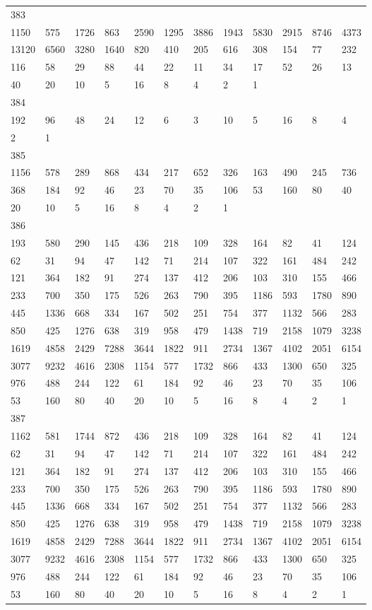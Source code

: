 \begin{longtable}{llllllllllll}
383&&&&&&&&&&&\\
1150& 575& 1726& 863& 2590& 1295& 3886& 1943& 5830& 2915& 8746& 4373\\
13120& 6560& 3280& 1640& 820& 410& 205& 616& 308& 154& 77& 232\\
116& 58& 29& 88& 44& 22& 11& 34& 17& 52& 26& 13\\
40& 20& 10& 5& 16& 8& 4& 2& 1& \\

384&&&&&&&&&&&\\
192& 96& 48& 24& 12& 6& 3& 10& 5& 16& 8& 4\\
2& 1& \\

385&&&&&&&&&&&\\
1156& 578& 289& 868& 434& 217& 652& 326& 163& 490& 245& 736\\
368& 184& 92& 46& 23& 70& 35& 106& 53& 160& 80& 40\\
20& 10& 5& 16& 8& 4& 2& 1& \\

386&&&&&&&&&&&\\
193& 580& 290& 145& 436& 218& 109& 328& 164& 82& 41& 124\\
62& 31& 94& 47& 142& 71& 214& 107& 322& 161& 484& 242\\
121& 364& 182& 91& 274& 137& 412& 206& 103& 310& 155& 466\\
233& 700& 350& 175& 526& 263& 790& 395& 1186& 593& 1780& 890\\
445& 1336& 668& 334& 167& 502& 251& 754& 377& 1132& 566& 283\\
850& 425& 1276& 638& 319& 958& 479& 1438& 719& 2158& 1079& 3238\\
1619& 4858& 2429& 7288& 3644& 1822& 911& 2734& 1367& 4102& 2051& 6154\\
3077& 9232& 4616& 2308& 1154& 577& 1732& 866& 433& 1300& 650& 325\\
976& 488& 244& 122& 61& 184& 92& 46& 23& 70& 35& 106\\
53& 160& 80& 40& 20& 10& 5& 16& 8& 4& 2& 1\\

387&&&&&&&&&&&\\
1162& 581& 1744& 872& 436& 218& 109& 328& 164& 82& 41& 124\\
62& 31& 94& 47& 142& 71& 214& 107& 322& 161& 484& 242\\
121& 364& 182& 91& 274& 137& 412& 206& 103& 310& 155& 466\\
233& 700& 350& 175& 526& 263& 790& 395& 1186& 593& 1780& 890\\
445& 1336& 668& 334& 167& 502& 251& 754& 377& 1132& 566& 283\\
850& 425& 1276& 638& 319& 958& 479& 1438& 719& 2158& 1079& 3238\\
1619& 4858& 2429& 7288& 3644& 1822& 911& 2734& 1367& 4102& 2051& 6154\\
3077& 9232& 4616& 2308& 1154& 577& 1732& 866& 433& 1300& 650& 325\\
976& 488& 244& 122& 61& 184& 92& 46& 23& 70& 35& 106\\
53& 160& 80& 40& 20& 10& 5& 16& 8& 4& 2& 1\\


\end{longtable}
